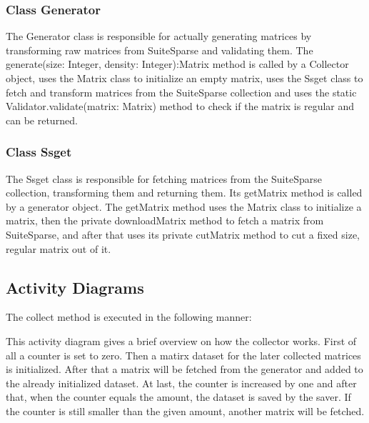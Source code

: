 \documentclass[parskip=full]{scrartcl}
\begin{document}
\subsubsection{Class Generator}
The Generator class is responsible for actually generating matrices by transforming raw matrices from SuiteSparse and validating them.
The generate(size: Integer, density: Integer):Matrix method is called by a Collector object, uses the Matrix class to initialize an empty matrix, uses the Ssget class to fetch and transform matrices from the SuiteSparse collection and uses the static Validator.validate(matrix: Matrix)  method to check if the matrix is regular and can be returned.

\subsubsection{Class Ssget}
The Ssget class is responsible for fetching matrices from the SuiteSparse collection, transforming them and returning them.
Its getMatrix method is called by a generator object.
The getMatrix method uses the Matrix class to initialize a matrix, then the private downloadMatrix method to fetch a matrix from SuiteSparse, and after that uses its private cutMatrix method to cut a fixed size, regular matrix out of it.

\subsection{Activity Diagrams}
The collect method is executed in the following manner:
\newpage
\begin{figure}[h]
\begin{center}

\label{Activity Diagrams}
\end{center}
\end{figure}
\newpage


This activity diagram gives a brief overview on how the collector works.
First of all a counter is set to zero. Then a matirx dataset for the later collected matrices is initialized.
After that a matrix will be fetched from the generator and added to the already initialized dataset.
At last, the counter is increased by one and after that, when the counter equals the amount, the dataset is saved by the saver.
If the counter is still smaller than the given amount, another matrix will be fetched.

\newpage
\begin{figure}[h]
\begin{center}

\label{Activity Diagrams}
\end{center}
\end{figure}
\newpage
\end{document}
